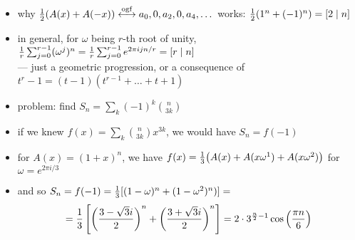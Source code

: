 \documentclass[10pt, a4paper]{article}
\newcommand*\ruleline[1]{\par\noindent\raisebox{.8ex}{\makebox[\linewidth]{\hrulefill\hspace{1ex}\raisebox{-.8ex}{#1}\hspace{1ex}\hrulefill}}}
\def\ogf{\overset{{\rm ogf}}{\longleftrightarrow}}
\begin{document}
\ruleline{Every third binomial coefficient [Wilf 51, example 4]}
\begin{itemize}
    \item why ${1\over 2}(A(x)+A(-x))\ogf a_0, 0, a_2, 0, a_4, \dots$ works: ${1\over 2}(1^n + (-1)^n) = [2\mid n]$
    \item in general, for $\omega$ being $r$-th root of unity, ${1\over r}\sum_{j=0}^{r-1} (\omega^j)^n = {1\over r}\sum_{j=0}^{r-1} e^{2\pi ijn/r} = [r\mid n]$\\
        --- just a geometric progression, or a consequence of $t^r-1=(t-1)(t^{r-1}+\dots+t+1)$
    \item problem: find $S_n = \sum_k (-1)^k{n\choose 3k}$
    \item if we knew $f(x) = \sum_k {n\choose 3k}x^{3k}$, we would have $S_n = f(-1)$
    \item for $A(x) = (1+x)^n$, we have $f(x) = {1\over 3}\big(A(x) + A(x\omega^1) + A(x\omega^2)\big)$ for $\omega=e^{2\pi i/3}$
    \item and so $S_n=f(-1) ={1\over 3}[(1-\omega)^n + (1-\omega^2)^n)] = $ $$ = {1\over 3}\left[\left({3-\sqrt3 i\over 2}\right)^n+\left({3+\sqrt3 i\over 2}\right)^n\right] = 2\cdot 3^{{n\over 2}-1}\cos\left({\pi n\over 6}\right)$$
\end{itemize}
\end{document}
